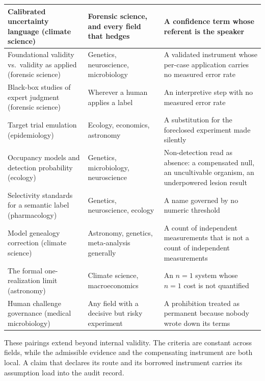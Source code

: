\documentclass{article}
\begin{document}
\begin{table}[H]
\begin{tabular}{@{}>{\raggedright\arraybackslash}p{3.4cm}>{\raggedright\arraybackslash}p{2.6cm}>{\raggedright\arraybackslash}p{8.9cm}@{}}
Calibrated uncertainty language (climate science) & Forensic science, and every field that hedges & A confidence term whose referent is the speaker \citep{mastrandrea2010guidance, pcast2016forensic} \\
\midrule
Foundational validity vs.\ validity as applied (forensic science) & Genetics, neuroscience, microbiology & A validated instrument whose per-case application carries no measured error rate \citep{pcast2016forensic, zautner2017more} \\
\midrule
Black-box studies of expert judgment (forensic science) & Wherever a human applies a label & An interpretive step with no measured error rate \citep{ulery2011accuracy, schnoes2009annotation} \\
\midrule
Target trial emulation (epidemiology) & Ecology, economics, astronomy & A substitution for the foreclosed experiment made silently \citep{hernan2016specifying, carpenter1989replication, anderl2016astronomy} \\
\midrule
Occupancy models and detection probability (ecology) & Genetics, microbiology, neuroscience & Non-detection read as absence: a compensated null, an uncultivable organism, an underpowered lesion result \citep{kellner2014accounting, elbrolosy2019genetic} \\
\midrule
Selectivity standards for a semantic label (pharmacology) & Genetics, neuroscience, ecology & A name governed by no numeric threshold \citep{arrowsmith2015promise} \\
\midrule
Model genealogy correction (climate science) & Astronomy, genetics, meta-analysis generally & A count of independent measurements that is not a count of independent measurements \citep{knutti2013climate, husain2026fifty} \\
\midrule
The formal one-realization limit (astronomy) & Climate science, macroeconomics & An $n = 1$ system whose $n = 1$ cost is not quantified \citep{kamionkowski1997getting} \\
\midrule
Human challenge governance (medical microbiology) & Any field with a decisive but risky experiment & A prohibition treated as permanent because nobody wrote down its terms \citep{jamrozik2021key} \\
\bottomrule
\end{tabular}
\end{table}

These pairings extend  beyond internal validity. The criteria are constant across fields, while the admissible evidence and the compensating instrument are both local. A claim that declares its route and its borrowed instrument carries its assumption load into the audit record.





\end{document}
